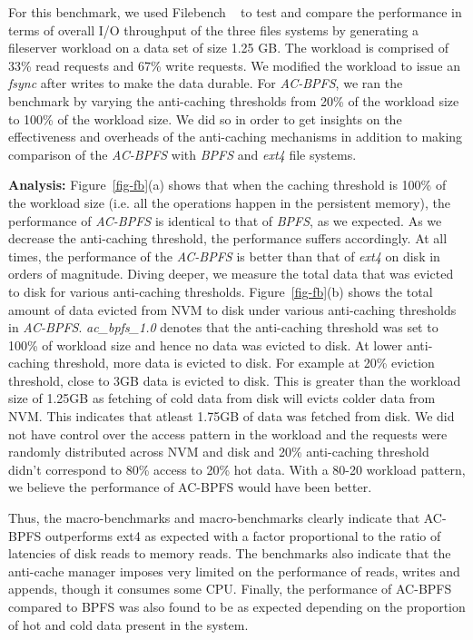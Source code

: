 For this benchmark, we used Filebench ~\cite{filebench} to test and compare the performance in terms of overall I/O throughput of the three files systems by generating a fileserver workload on a data set of size 1.25 GB. The workload is comprised of 33\% read requests and 67\% write requests. We modified the workload to issue an \textit{fsync} after writes to make the data durable. For \textit{AC-BPFS}, we ran the benchmark by varying the anti-caching thresholds from 20\% of the workload size to 100\% of the workload size. We did so in order to get insights on the effectiveness and overheads of the anti-caching mechanisms in addition to making comparison of the \textit{AC-BPFS} with \textit{BPFS} and \textit{ext4} file systems.

\textbf{Analysis:} Figure~\ref{fig-fb}(a) shows that when the caching threshold is 100\% of the workload size (i.e. all the operations happen in the persistent memory), the performance of \textit{AC-BPFS} is identical to that of \textit{BPFS}, as we expected. As we decrease the anti-caching threshold, the performance suffers accordingly. At all times, the performance of the \textit{AC-BPFS} is better than that of \textit{ext4} on disk in orders of magnitude. Diving deeper, we measure the total data that was evicted to disk for various anti-caching thresholds. Figure~\ref{fig-fb}(b) shows the total amount of data evicted from NVM to disk under various anti-caching thresholds in \textit{AC-BPFS}. \textit{ac\_bpfs\_1.0} denotes that the anti-caching threshold was set to 100\% of workload size and hence no data was evicted to disk. At lower anti-caching threshold, more data is evicted to disk. For example at 20\% eviction threshold, close to 3GB data is evicted to disk. This is greater than the workload size of 1.25GB as fetching of cold data from disk will evicts colder data from NVM. This indicates that atleast 1.75GB of data was fetched from disk. We did not have control over the access pattern in the workload and the requests were randomly distributed across NVM and disk and 20\% anti-caching threshold didn't correspond to 80\% access to 20\% hot data. With a 80-20 workload pattern, we believe the performance of AC-BPFS would have been better.

Thus, the macro-benchmarks and macro-benchmarks clearly indicate that AC-BPFS outperforms ext4 as expected with a factor proportional to the ratio of latencies of disk reads to memory reads. The benchmarks also indicate that the anti-cache manager imposes very limited on the performance of reads, writes and appends, though it consumes some CPU. Finally, the performance of AC-BPFS compared to BPFS was also found to be as expected depending on the proportion of hot and cold data present in the system. 
